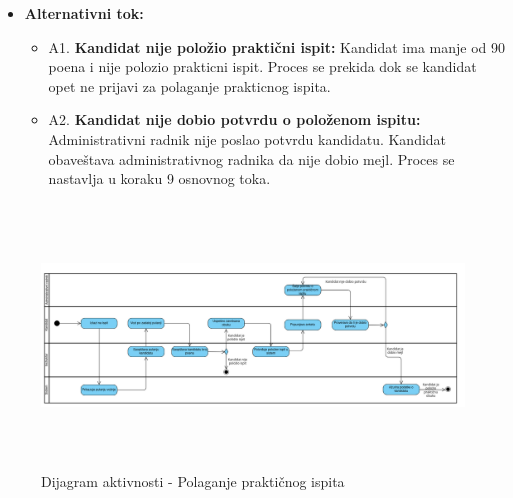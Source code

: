 \begin{itemize}
\begin{enumerate}
   \end{enumerate}

\item \textbf{Alternativni tok:}  
   \begin{itemize}
   \item A1. \textbf{Kandidat nije položio praktični ispit:}
  Kandidat ima manje od 90 poena i nije polozio prakticni ispit. Proces se prekida dok se kandidat opet ne prijavi za polaganje prakticnog ispita. 
  \item A2. \textbf{Kandidat nije dobio potvrdu o položenom ispitu:}
  Administrativni radnik nije poslao potvrdu kandidatu. Kandidat obaveštava administrativnog radnika da nije dobio mejl. Proces se nastavlja u koraku 9 osnovnog toka.
   \end{itemize}

\end{itemize}  

\begin{figure}[H]
  \begin{center}
      \includegraphics[width=140mm, height=70mm]{Diagrams/dijagram_aktivnosti_polaganje_prakticnog_ispita.png}
  \end{center}
  \caption {Dijagram aktivnosti - Polaganje praktičnog ispita}
  \label{activity_polaganje_praktičnog_ispita}

\end{figure}
